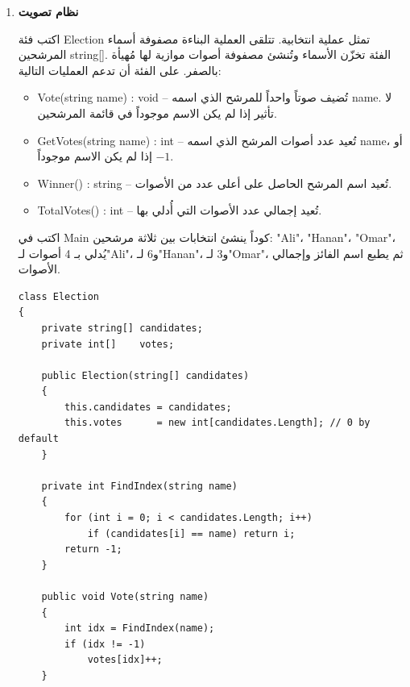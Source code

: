 \documentclass[14pt]{extarticle}
\begin{document}
\begin{enumerate}
\item \textbf{نظام تصويت}

اكتب فئة \textenglish{Election} تمثل عملية انتخابية.
تتلقى العملية البناءة مصفوفة أسماء المرشحين \textenglish{string[]}.
الفئة تخزّن الأسماء وتُنشئ مصفوفة أصوات موازية لها مُهيأة بالصفر.
على الفئة أن تدعم العمليات التالية:

\begin{itemize}
  \item \textenglish{Vote(string name) : void} --
        تُضيف صوتاً واحداً للمرشح الذي اسمه \textenglish{name}.
        لا تأثير إذا لم يكن الاسم موجوداً في قائمة المرشحين.

  \item \textenglish{GetVotes(string name) : int} --
        تُعيد عدد أصوات المرشح الذي اسمه \textenglish{name}،
        أو $-1$ إذا لم يكن الاسم موجوداً.

  \item \textenglish{Winner() : string} --
        تُعيد اسم المرشح الحاصل على أعلى عدد من الأصوات.

  \item \textenglish{TotalVotes() : int} --
        تُعيد إجمالي عدد الأصوات التي أُدلي بها.
\end{itemize}

اكتب في \textenglish{Main} كوداً ينشئ انتخابات بين ثلاثة مرشحين:
\textenglish{"Ali"}، \textenglish{"Hanan"}، \textenglish{"Omar"}،
يُدلي بـ 4 أصوات لـ\textenglish{"Ali"}، و6 لـ\textenglish{"Hanan"}، و3 لـ\textenglish{"Omar"}،
ثم يطبع اسم الفائز وإجمالي الأصوات.

\ifwithsols
{\small
\begin{boxSolution}
\begin{english}
\begin{verbatim}
class Election
{
    private string[] candidates;
    private int[]    votes;

    public Election(string[] candidates)
    {
        this.candidates = candidates;
        this.votes      = new int[candidates.Length]; // 0 by default
    }

    private int FindIndex(string name)
    {
        for (int i = 0; i < candidates.Length; i++)
            if (candidates[i] == name) return i;
        return -1;
    }

    public void Vote(string name)
    {
        int idx = FindIndex(name);
        if (idx != -1)
            votes[idx]++;
    }


\end{verbatim}
\end{english}
\end{boxSolution}}
\end{enumerate}
\end{document}
